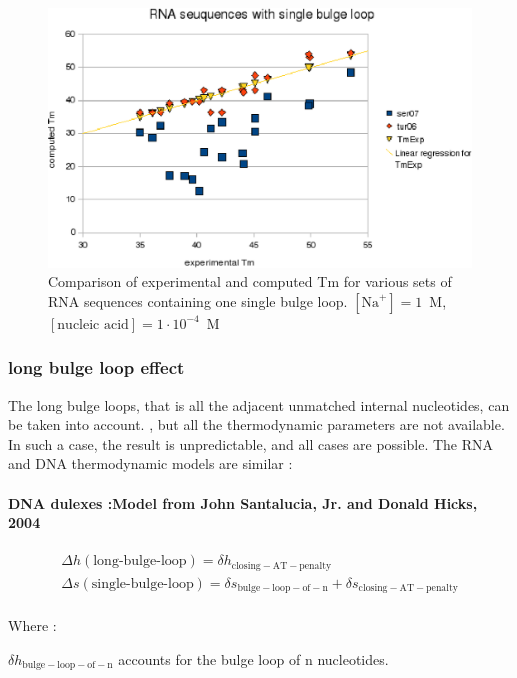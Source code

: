 \documentclass{article}
\begin{document}
\begin{figure}[h]
\includegraphics{images/RNASingleBulgeLoop.eps}
\caption{Comparison of experimental and computed Tm for various sets of
 RNA sequences containing one single bulge loop. $[\mbox{Na}^+] = 1$~M, $[\mbox{nucleic acid}] = 1\cdot{}10^{-4}$~M}
\end{figure}

\subsubsection{long bulge loop effect}

The long bulge loops, that is all the adjacent unmatched internal nucleotides, can be taken into
account. , but all the thermodynamic parameters are not available. In such a case, 
the result is unpredictable, and all cases are possible. 
The RNA and DNA thermodynamic models are similar : 
  
\paragraph{DNA dulexes :\textbf{Model from John Santalucia, Jr. and Donald Hicks, 2004}} 

\begin{multline*}
\Delta h {(\mbox{long-bulge-loop})} =
\delta{}h_\mathrm{closing-AT-penalty}\\
\Delta s {(\mbox{single-bulge-loop})} =
\delta{}s_\mathrm{bulge-loop-of-n} +
\delta{}s_\mathrm{closing-AT-penalty}\\
\end{multline*}


Where :

$\delta{}h_\mathrm{bulge-loop-of-n}$ accounts for the bulge loop of n nucleotides.
\end{document}
